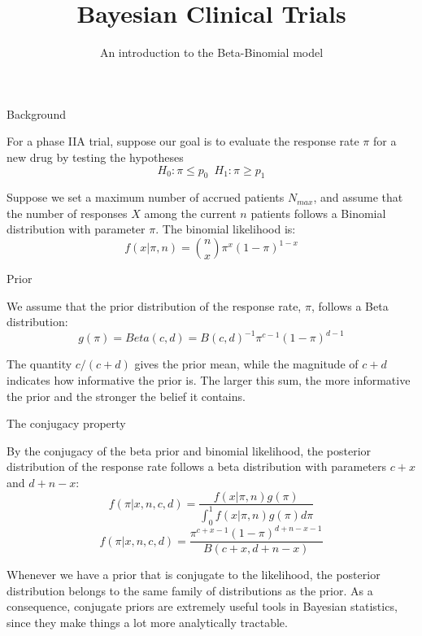 \documentclass{beamer}
\title[]{Bayesian Clinical Trials}
\subtitle{An introduction to the Beta-Binomial model}
\date{}
\begin{document}
\begin{frame}
\titlepage %
\end{frame}


\begin{frame}{Background}

For a phase IIA trial, suppose our goal is to evaluate the response rate
\(\pi\) for a new drug by testing the hypotheses
\[H_{0}: \pi \le p_{0} \phantom{0}H_{1}: \pi \ge p_{1}\]

Suppose we set a maximum number of accrued patients \(N_{max}\), and
assume that the number of responses \(X\) among the current \(n\)
patients follows a Binomial distribution with parameter \(\pi\). The
binomial likelihood is:
\[f\left(x|\pi,n\right)=\binom{n}{x} \pi^{x}\left(1-\pi\right)^{1-x}\]

\end{frame}

\begin{frame}{Prior}

We assume that the prior distribution of the response rate, \(\pi\),
follows a Beta distribution:
\[g\left(\pi\right)=Beta\left(c,d\right)=B\left(c,d\right)^{-1}\pi^{c-1}\left(1-\pi\right)^{d-1}\]

The quantity \(c/\left(c + d\right)\) gives the prior mean, while the
magnitude of \(c + d\) indicates how informative the prior is. The
larger this sum, the more informative the prior and the stronger the
belief it contains.

\end{frame}

\begin{frame}{The conjugacy property}

By the conjugacy of the beta prior and binomial likelihood, the
posterior distribution of the response rate follows a beta distribution
with parameters \(c+x\) and \(d+n-x\):
\[f\left(\pi|x,n,c,d\right)=\frac{f\left(x|\pi,n\right)g\left(\pi\right)}{\int_0^1 f\left(x|\pi,n\right)g\left(\pi\right) d\pi}\]
\[f\left(\pi|x,n,c,d\right)= \frac {\pi^{c+x-1}\left(1-\pi\right)^{d+n-x-1}} {B\left(c+x,d+n-x\right)}\]

Whenever we have a prior that is conjugate to the likelihood, the
posterior distribution belongs to the same family of distributions as
the prior. As a consequence, conjugate priors are extremely useful tools
in Bayesian statistics, since they make things a lot more analytically
tractable.

\end{frame}
\end{document}
